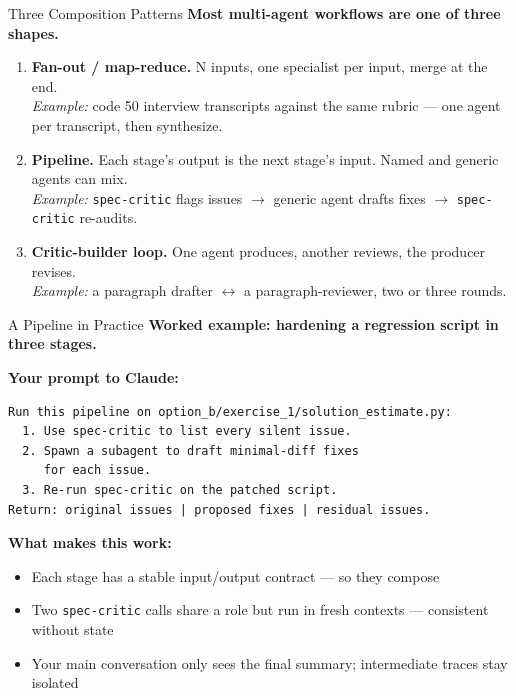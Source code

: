 \documentclass[aspectratio=169, 11pt]{beamer}
\begin{document}
\begin{frame}{Three Composition Patterns}
  \textbf{Most multi-agent workflows are one of three shapes.}

  \vspace{0.7em}
  \begin{enumerate}
    \item \textbf{Fan-out / map-reduce.} N inputs, one specialist per input, merge at the end.\\
    \emph{Example:} code 50 interview transcripts against the same rubric --- one agent per transcript, then synthesize.

    \vspace{0.5em}
    \item \textbf{Pipeline.} Each stage's output is the next stage's input. Named and generic agents can mix.\\
    \emph{Example:} \texttt{spec-critic} flags issues $\to$ generic agent drafts fixes $\to$ \texttt{spec-critic} re-audits.

    \vspace{0.5em}
    \item \textbf{Critic-builder loop.} One agent produces, another reviews, the producer revises.\\
    \emph{Example:} a paragraph drafter $\leftrightarrow$ a paragraph-reviewer, two or three rounds.
  \end{enumerate}
\end{frame}

\begin{frame}[fragile]{A Pipeline in Practice}
  \textbf{Worked example: hardening a regression script in three stages.}

  \vspace{0.3em}
  \textbf{Your prompt to Claude:}
  \begin{lstlisting}[basicstyle=\ttfamily\scriptsize]
Run this pipeline on option_b/exercise_1/solution_estimate.py:
  1. Use spec-critic to list every silent issue.
  2. Spawn a subagent to draft minimal-diff fixes
     for each issue.
  3. Re-run spec-critic on the patched script.
Return: original issues | proposed fixes | residual issues.
  \end{lstlisting}

  \vspace{0.3em}
  \textbf{What makes this work:}
  \begin{itemize}\small
    \item Each stage has a stable input/output contract --- so they compose
    \item Two \texttt{spec-critic} calls share a role but run in fresh contexts --- consistent without state
    \item Your main conversation only sees the final summary; intermediate traces stay isolated
  \end{itemize}

\end{frame}
\end{document}
